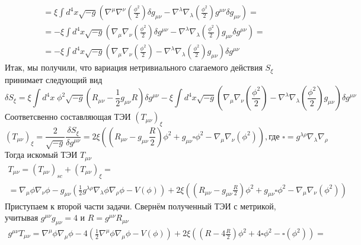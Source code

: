 \documentclass[12pt]{article}
\theoremstyle{definition}
\begin{document}
\begin{enumerate}
\begin{multline}
     = \xi \int d^4x \sqrt{-g}\left(\nabla^{\mu}\nabla^{\nu}\left(\frac{\phi^2}{2}\right)\delta g_{\mu\nu}-\nabla^{\lambda}\nabla_{\lambda}\left(\frac{\phi^2}{2}\right)g^{\mu\nu}\delta g_{\mu\nu}\right)=\\
     =-\xi \int d^4x \sqrt{-g}\left(\nabla_{\mu}\nabla_{\nu}\left(\frac{\phi^2}{2}\right)\delta g^{\mu\nu}-\nabla^{\lambda}\nabla_{\lambda}\left(\frac{\phi^2}{2}\right)g_{\mu\nu}\delta g^{\mu\nu}\right)=\\
     =-\xi \int d^4x \sqrt{-g}\left(\nabla_{\mu}\nabla_{\nu}\left(\frac{\phi^2}{2}\right)-\nabla^{\lambda}\nabla_{\lambda}\left(\frac{\phi^2}{2}\right)g_{\mu\nu}\right)\delta g^{\mu\nu}
\end{multline}
Итак, мы получили, что вариация нетривиального слагаемого действия $S_{\xi}$ принимает следующий вид
\begin{equation*}
    \delta S_{\xi}=\xi\int d^4x\; \phi^2 \sqrt{-g}\left(R_{\mu\nu}-\frac{1}{2}g_{\mu\nu}R\right)\delta g^{\mu\nu}-\xi \int d^4x \sqrt{-g}\left(\nabla_{\mu}\nabla_{\nu}\left(\frac{\phi^2}{2}\right)-\nabla^{\lambda}\nabla_{\lambda}\left(\frac{\phi^2}{2}\right)g_{\mu\nu}\right)\delta g^{\mu\nu}
\end{equation*}
Соответсвенно составляющая ТЭИ $\left(T_{\mu\nu}\right)_{\xi}$
\begin{equation*}
    \left(T_{\mu\nu}\right)_{\xi}=\frac{2}{\sqrt{-g}}\frac{\delta S_{\xi}}{\delta g^{\mu\nu}}=2\xi\left(\left(R_{\mu\nu}-g_{\mu\nu}\frac{R}{2}\right)\phi^2+g_{\mu\nu} \square \phi^2-\nabla_{\mu}\nabla_{\nu}(\phi^2)\right), \text{где $\square = g^{\lambda\rho}\nabla_{\lambda}\nabla_{\rho}$ }
\end{equation*}
Тогда искомый ТЭИ $T_{\mu\nu}$
\begin{multline*}
    T_{\mu\nu}=(T_{\mu\nu})_{sc}+(T_{\mu\nu})_{\xi}=\\ =\nabla_\mu\phi\nabla_\nu\phi-g_{\mu\nu}\left(\frac{1}{2}g^{\lambda\rho}\nabla_\lambda\phi\nabla_\rho\phi - V(\phi)\right)+2\xi\left(\left(R_{\mu\nu}-g_{\mu\nu}\frac{R}{2}\right)\phi^2+g_{\mu\nu} \square \phi^2-\nabla_{\mu}\nabla_{\nu}(\phi^2)\right)
\end{multline*}
Приступаем к второй части задачи. Свернём полученный ТЭИ с метрикой, учитывая $g^{\mu\nu}g_{\mu\nu}=4$ и $R=g^{\mu\nu}R_{\mu\nu}$
\begin{multline}\label{eq11}
    g^{\mu\nu}T_{\mu\nu}= \nabla^{\mu}\phi\nabla_{\mu}\phi-4\left(\frac{1}{2}\nabla^\mu\phi\nabla_\mu\phi - V(\phi)\right)+2\xi\left(\left(R-4\frac{R}{2}\right)\phi^2+4\square \phi^2-\square(\phi^2)\right)=\\

\end{multline}
\end{enumerate}
\end{document}
